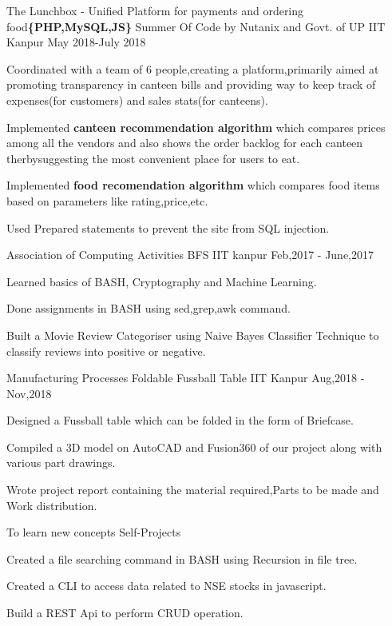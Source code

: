 
\begin{cventries}

  \cventry
  {The Lunchbox - Unified Platform for payments and ordering food\textbf{\{PHP,MySQL,JS\}}}
  {Summer Of Code by Nutanix and Govt. of UP}
  {IIT Kanpur}
  {May 2018-July 2018}
  {
    \begin{cvitems}
    \item Coordinated with a team of 6 people,creating a platform,primarily aimed at promoting transparency in canteen bills and providing way to keep track of expenses(for customers) and sales stats(for canteens). 
    \item Implemented \textbf{canteen recommendation algorithm} which compares prices among all the vendors and also shows the order backlog for each canteen therbysuggesting the most convenient place for users to eat. 
    \item Implemented \textbf{food recomendation algorithm} which compares food items based on parameters like rating,price,etc.
    \item Used Prepared statements to prevent the site from SQL injection.
    \end{cvitems}
  }
  \cventry
  {Association of Computing Activities}
  {BFS}
  {IIT kanpur}
  {Feb,2017 - June,2017}
  {
     \begin{cvitems}
      \item Learned basics of BASH, Cryptography and Machine Learning.
      \item Done assignments in BASH using sed,grep,awk command.
      \item Built a Movie Review Categoriser using Naive Bayes Classifier Technique
            to classify reviews into positive or negative.
     \end{cvitems}
  }
  \cventry 
  {Manufacturing Processes}
  {Foldable Fussball Table}
  {IIT Kanpur}
  {Aug,2018 - Nov,2018}
  {
    \begin{cvitems}
      \item Designed a Fussball table which can be folded in the form of Briefcase.
      \item Compiled a 3D model on AutoCAD and Fusion360 of our project along with various part drawings.
      \item Wrote project report containing the material required,Parts to be made and Work distribution.
    \end{cvitems}
  }
  \cventry
  {To learn new concepts}
  {Self-Projects}
  {}
  {}
  {
    \begin{cvitems}
      \item Created a file searching command in BASH using Recursion in file tree.
      \item Created a CLI to access data related to NSE stocks in javascript.
      \item Build a REST Api to perform CRUD operation.
    \end{cvitems}
  }
\end{cventries}


